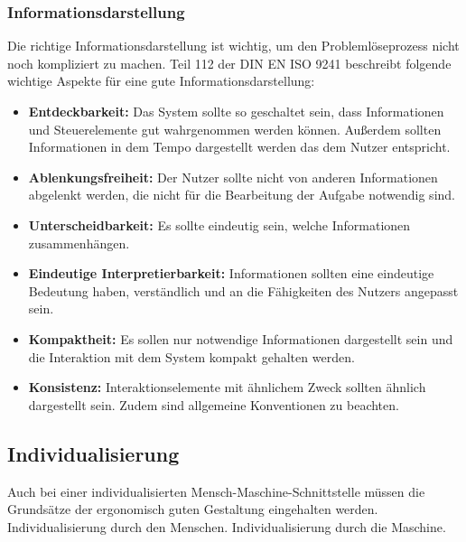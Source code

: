 \subsubsection*{Informationsdarstellung}
Die richtige Informationsdarstellung ist wichtig, um den Problemlöseprozess nicht noch kompliziert zu machen. Teil 112 der DIN EN ISO 9241 beschreibt folgende wichtige Aspekte für eine gute Informationsdarstellung:
\begin{itemize}
\item \textbf{Entdeckbarkeit:} Das System sollte so geschaltet sein, dass Informationen und Steuerelemente gut wahrgenommen werden können. Außerdem sollten Informationen in dem Tempo dargestellt werden das dem Nutzer entspricht.
\item \textbf{Ablenkungsfreiheit:} Der Nutzer sollte nicht von anderen Informationen abgelenkt werden, die nicht für die Bearbeitung der Aufgabe notwendig sind.
\item \textbf{Unterscheidbarkeit:} Es sollte eindeutig sein, welche Informationen zusammenhängen.
\item \textbf{Eindeutige Interpretierbarkeit:} Informationen sollten eine eindeutige Bedeutung haben, verständlich und an die Fähigkeiten des Nutzers angepasst sein.
\item \textbf{Kompaktheit:} Es sollen nur notwendige Informationen dargestellt sein und die Interaktion mit dem System kompakt gehalten werden.
\item \textbf{Konsistenz:} Interaktionselemente mit ähnlichem Zweck sollten ähnlich dargestellt sein. Zudem sind allgemeine Konventionen zu beachten.
\end{itemize}


\subsection{Individualisierung}
Auch bei einer individualisierten Mensch-Maschine-Schnittstelle müssen die Grundsätze der ergonomisch guten Gestaltung eingehalten werden. 
Individualisierung durch den Menschen. Individualisierung durch die Maschine.


